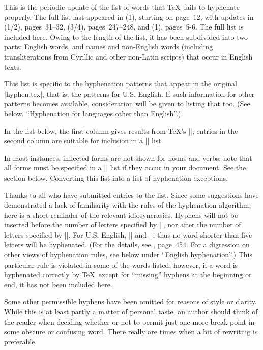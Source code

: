 
\article

This is the periodic update of the list of words that \TeX\ fails to
hyphenate properly.  The full list last appeared in (1),
starting on page~12, with updates in (1/2), pages~31--32,
(3/4), pages~247--248, and (1), pages~5-6.
The full list is included here.
Owing to the length of the list, it has been subdivided into two parts:
English words, and names and non-English words (including transliterations
from Cyrillic and other non-Latin scripts) that occur in English texts.

This list is specific to the hyphenation patterns that appear in
the original |hyphen.tex|, that is, the patterns for U.S. English.
If such information for other patterns becomes available, consideration
will be given to listing that too.  (See below, ``Hyphenation for
languages other than English''.)

In the list below, the first column gives results from \TeX's
||; entries in the second column are suitable for
inclusion in a || list.

In most instances, inflected forms are not shown for nouns and verbs;
note that all forms must be specified in a || list
if they occur in your document.  See the section below, Converting this
list into a list of hyphenation exceptions.

Thanks to all who have submitted entries to the list.  Since some
suggestions have demonstrated a lack of familiarity with the rules of
the hyphenation algorithm, here is a short reminder of the relevant
idiosyncrasies.  Hyphens will not be inserted before the number of
letters specified by |\lefthyphenmin|, nor after the number of letters
specified by |\righthyphenmin|.  For U.S. English, ||
and ||; thus no word shorter than five
letters will be hyphenated.  (For the details, see \TB, page~454.  For a
digression on other views of hyphenation rules, see below under ``English
hyphenation''.)  This particular rule is violated in some of the words
listed; however, if a word is hyphenated correctly by \TeX\ except for
``missing'' hyphens at the beginning or end, it has not been included here.

Some other permissible hyphens have been omitted
for reasons of style or clarity.  While this is at
least partly a matter of personal taste, an author should think of the
reader when deciding whether or not to permit just one more break-point
in some obscure or confusing word.  There really are times when a bit of
rewriting is preferable.

